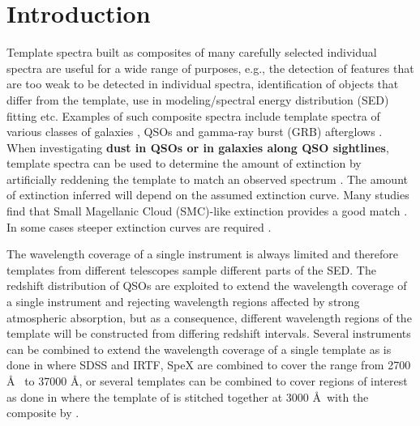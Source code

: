 \documentclass{aa}    %
\newcommand{\sectlabel}[1]{\label{sect:#1}}
\begin{document}
\maketitle
%


\section{Introduction}     \sectlabel{introduction}
Template spectra built as composites of many carefully selected
individual spectra are useful for a wide range of purposes, e.g., the
detection of features that are too weak to be detected in individual
spectra, identification of objects that differ from the template, use
in modeling/spectral energy distribution (SED) fitting etc. Examples of such composite spectra
include template spectra of various classes of galaxies
\citep{Mannucci2001, Shapley2003, Dobos2012}, QSOs
\citep{CristianiS.andVio1990, Boyle1990, Francis1991, Zheng1997,
  Brotherton2000, VandenBerk2001, Telfer2002, Richards2006a,
  Glikman2006, Lusso2015} and gamma-ray burst (GRB) afterglows \citep{Christensen2011}.
When investigating \textbf{dust in QSOs or in galaxies along QSO sightlines}, template spectra can be used to determine the amount of
extinction by artificially reddening the template to match an observed
spectrum
\citep[e.g.,][]{Glikman2007,Urrutia2009,Wang2012,Fynbo2013,Krogager2015}.
The amount of extinction inferred will depend on the assumed
extinction curve. Many studies find that Small Magellanic Cloud (SMC)-like extinction provides
a good match \citep{Richards2003,Hopkins2004}. In some cases steeper
extinction curves are required
\citep{Fynbo2013,Jiang2013,Leighly2014}.

The wavelength coverage of a single instrument is always limited and
therefore templates from different telescopes sample different parts
of the SED. The redshift distribution of QSOs
are exploited to extend the wavelength coverage of a single instrument
and rejecting wavelength regions affected by strong atmospheric
absorption, but as a consequence, different wavelength regions of the
template will be constructed from differing redshift
intervals. Several instruments can be combined to extend the
wavelength coverage of a single template as is done in
\citet{Glikman2006} where SDSS \citep{Gunn2006} and IRTF, SpeX
\citep{Rayner2003} are combined to cover the range from 2700 \AA~ to
37000 \AA, or several templates can be combined to cover regions of
interest as done in \citet{Zhou2010} where the template of
\citet{VandenBerk2001} is stitched together at 3000 \AA~with the
composite by \citet{Glikman2006}. 
\end{document}
